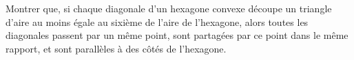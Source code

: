 Montrer que, si chaque diagonale d'un hexagone convexe découpe un triangle d'aire au moins égale au sixième de l'aire de l'hexagone, alors toutes les diagonales passent par un même point, sont partagées par ce point dans le même rapport, et sont parallèles à des côtés de l'hexagone.
